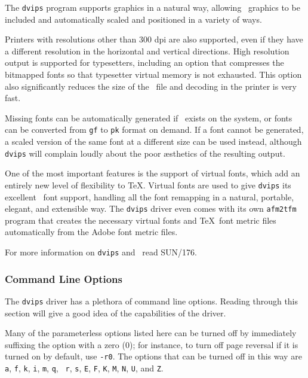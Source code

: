The {\tt dvips} program supports graphics in a natural way, allowing \PS\
graphics to be included and automatically scaled and positioned in a variety
of ways.

Printers with resolutions other than 300 dpi are also supported, even if they
have a different resolution in the horizontal and vertical directions.
High resolution output is supported for typesetters, including an option
that compresses the bitmapped fonts so that typesetter virtual memory is
not exhausted.  This option also significantly reduces the size of the
\PS\ file and decoding in the printer is very fast.

Missing fonts can be automatically generated if \MF\ exists on the system,
or fonts can be converted from {\tt gf} to {\tt pk} format on demand.
If a font cannot be generated, a scaled version of the same font at a
different size can be used instead, although {\tt dvips} will complain
loudly about the poor \ae sthetics of the resulting output.

One of the most important features is the support of virtual fonts, which
add an entirely new level of flexibility to \TeX.  Virtual fonts are used to
give {\tt dvips} its excellent \PS\ font support, handling all the font
remapping in a natural, portable, elegant, and extensible way.  The {\tt dvips}
driver even comes with its own {\tt afm2tfm} program that creates the necessary
virtual fonts and \TeX\ font metric files automatically from the Adobe
font metric files.

For more information on \verb+dvips+ and \PS\ read SUN/176.


\subsubsection{Command Line Options} 
\label{dvipsoptions}

The {\tt dvips} driver has a plethora of command line options.  Reading
through this section will give a good idea of the capabilities of the
driver.

Many of the parameterless options listed here can be turned off by immediately
suffixing the option with a zero (0); for instance, to turn off page reversal
if it is turned on by default, use {\tt -r0}.  The options that can be turned
off in this way are {\tt a}, {\tt f}, {\tt k}, {\tt i}, {\tt m}, {\tt q}, {\tt
r},
{\tt s}, {\tt E}, {\tt F}, {\tt K}, {\tt M}, {\tt N}, {\tt U}, and {\tt Z}.

